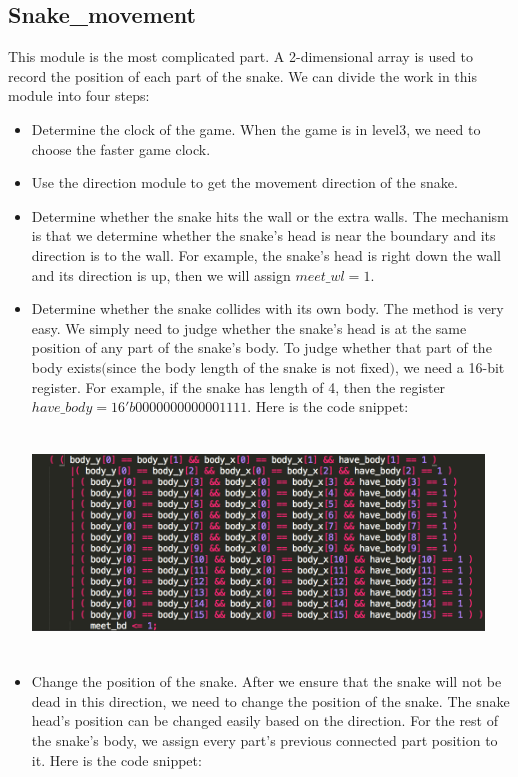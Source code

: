 \documentclass[12pt]{article}
\begin{document}
\subsection*{Snake\_movement}
This module is the most complicated part. A 2-dimensional array is used to record the position of each part of the snake. We can divide the work in this module into four steps:
\begin{itemize}
\item Determine the clock of the game. When the game is in level3, we need to choose the faster game clock.
\item Use the direction module to get the movement direction of the snake.
\item Determine whether the snake hits the wall or the extra walls. The mechanism is that we determine whether the snake's head is near the boundary and its direction is to the wall. For example, the snake's head is right down the wall and its direction is up, then we will assign $meet\_wl = 1$.
\item Determine whether the snake collides with its own body. The method is very easy. We simply need to judge whether the snake's head is at the same position of any part of the snake's body. To judge whether that part of the body exists$($since the body length of the snake is not fixed$)$, we need a 16-bit register. For example, if the snake has length of 4, then the register $have\_body = 16'b0000000000001111$. Here is the code snippet: \\ 
\begin{minipage}{\linewidth}
            \centering
            \includegraphics[width=12cm, height=5.9cm]{judgebody.png}
        \end{minipage} 
\item Change the position of the snake. After we ensure that the snake will not be dead in this direction, we need to change the position of the snake. The snake head's position can be changed easily based on the direction. For the rest of the snake's body, we assign every part's previous connected part position to it. Here is the code snippet:

\end{itemize}
\end{document}
